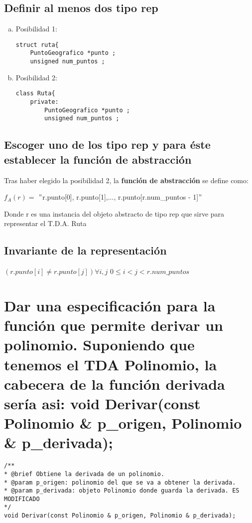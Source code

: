 \subsection{Definir al menos dos tipo rep}
\begin{enumerate}[a)]
\item Posibilidad 1:
\begin{lstlisting}[style=cmas]
struct ruta{
	PuntoGeografico *punto ; 
	unsigned num_puntos ;		
\end{lstlisting}
\setlength{\parskip}{-4mm}
\item Posibilidad 2:
\begin{lstlisting}[style=cmas]
class Ruta{
	private:
		PuntoGeografico *punto ; 
		unsigned num_puntos ;	
\end{lstlisting}
\end{enumerate}

\subsection{Escoger uno de los tipo rep y para éste establecer la función de abstracción}
Tras haber elegido la posibilidad 2, la \textbf{función de abstracción} se define como:\\
\begin{center}
	$ f_{A}(r) = $ $ " $r.punto[0], r.punto[1],..., r.punto[r.num\_puntos - 1]$ " $
\end{center}
Donde r es una instancia del objeto abstracto de tipo rep que sirve para representar el T.D.A. Ruta

\subsection{Invariante de la representación}
\begin{center}
	$ (r.punto[i] \neq r.punto[j])\forall i,j $ $0 \leq i < j < r.num\_puntos $
\end{center}

\newpage

\section{Dar una especificación para la función que permite derivar un polinomio. Suponiendo que
	tenemos el TDA Polinomio, la cabecera de la función derivada sería asi:
	void Derivar(const Polinomio \& p\_origen, Polinomio \& p\_derivada);}

\begin{lstlisting}[style=cmas]
/**
* @brief Obtiene la derivada de un polinomio.
* @param p_origen: polinomio del que se va a obtener la derivada. 
* @param p_derivada: objeto Polinomio donde guarda la derivada. ES MODIFICADO
*/	
void Derivar(const Polinomio & p_origen, Polinomio & p_derivada);
\end{lstlisting}


